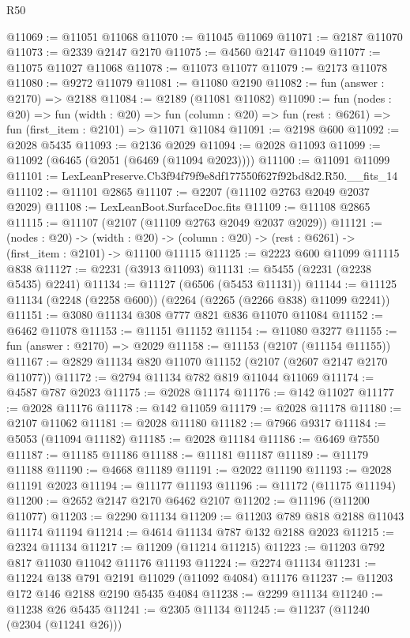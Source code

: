 \begin{lexlean}{R50}
\begin{coremodule}
@11069 := @11051 @11068
@11070 := @11045 @11069
@11071 := @2187 @11070
@11073 := @2339 @2147 @2170
@11075 := @4560 @2147 @11049
@11077 := @11075 @11027 @11068
@11078 := @11073 @11077
@11079 := @2173 @11078
@11080 := @9272 @11079
@11081 := @11080 @2190
@11082 := fun (answer : @2170) => @2188
@11084 := @2189 (@11081 @11082)
@11090 := fun (nodes : @20) =>
  fun (width : @20) =>
  fun (column : @20) => fun (rest : @6261) => fun (first_item : @2101) => @11071 @11084
@11091 := @2198 @600
@11092 := @2028 @5435
@11093 := @2136 @2029
@11094 := @2028 @11093
@11099 := @11092 (@6465 (@2051 (@6469 (@11094 @2023))))
@11100 := @11091 @11099
@11101 := LexLeanPreserve.Cb3f94f79f9e8df177550f627f92bd8d2.R50.__fits_14
@11102 := @11101 @2865
@11107 := @2207 (@11102 @2763 @2049 @2037 @2029)
@11108 := LexLeanBoot.SurfaceDoc.fits
@11109 := @11108 @2865
@11115 := @11107 (@2107 (@11109 @2763 @2049 @2037 @2029))
@11121 := (nodes : @20) ->
  (width : @20) -> (column : @20) -> (rest : @6261) -> (first_item : @2101) -> @11100 @11115
@11125 := @2223 @600 @11099 @11115 @838
@11127 := @2231 (@3913 @11093)
@11131 := @5455 (@2231 (@2238 @5435) @2241)
@11134 := @11127 (@6506 (@5453 @11131))
@11144 := @11125 @11134 (@2248 (@2258 @600)) (@2264 (@2265 (@2266 @838) @11099 @2241))
@11151 := @3080 @11134 @308 @777 @821 @836 @11070 @11084
@11152 := @6462 @11078
@11153 := @11151 @11152
@11154 := @11080 @3277
@11155 := fun (answer : @2170) => @2029
@11158 := @11153 (@2107 (@11154 @11155))
@11167 := @2829 @11134 @820 @11070 @11152 (@2107 (@2607 @2147 @2170 @11077))
@11172 := @2794 @11134 @782 @819 @11044 @11069
@11174 := @4587 @787 @2023
@11175 := @2028 @11174
@11176 := @142 @11027
@11177 := @2028 @11176
@11178 := @142 @11059
@11179 := @2028 @11178
@11180 := @2107 @11062
@11181 := @2028 @11180
@11182 := @7966 @9317
@11184 := @5053 (@11094 @11182)
@11185 := @2028 @11184
@11186 := @6469 @7550
@11187 := @11185 @11186
@11188 := @11181 @11187
@11189 := @11179 @11188
@11190 := @4668 @11189
@11191 := @2022 @11190
@11193 := @2028 @11191 @2023
@11194 := @11177 @11193
@11196 := @11172 (@11175 @11194)
@11200 := @2652 @2147 @2170 @6462 @2107
@11202 := @11196 (@11200 @11077)
@11203 := @2290 @11134
@11209 := @11203 @789 @818 @2188 @11043 @11174 @11194
@11214 := @4614 @11134 @787 @132 @2188 @2023
@11215 := @2324 @11134
@11217 := @11209 (@11214 @11215)
@11223 := @11203 @792 @817 @11030 @11042 @11176 @11193
@11224 := @2274 @11134
@11231 := @11224 @138 @791 @2191 @11029 (@11092 @4084) @11176
@11237 := @11203 @172 @146 @2188 @2190 @5435 @4084
@11238 := @2299 @11134
@11240 := @11238 @26 @5435
@11241 := @2305 @11134
@11245 := @11237 (@11240 (@2304 (@11241 @26)))

\end{coremodule}
\end{lexlean}
